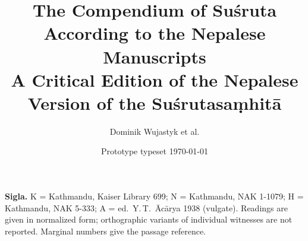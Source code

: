 \documentclass[10pt,twoside]{book}
\title{\normalfont The Compendium of Suśruta\\[4pt]
  \large According to the Nepalese Manuscripts\\[10pt]
  \normalsize A Critical Edition of the Nepalese Version of the Suśrutasaṃhitā\\[20pt]
  \Large\skt{सुश्रुतसंहिता}}
\author{\normalfont Dominik Wujastyk et al.}
\date{\normalfont Prototype typeset \today}
\providecommand{\bodyfile}{all-bodies.tex}
\begin{document}
\maketitle
{\rmfamily\small\noindent\textbf{Sigla.} K = Kathmandu, Kaiser Library 699;
N = Kathmandu, NAK 1-1079; H = Kathmandu, NAK 5-333;
A = ed.\ Y.\,T.~Ācārya 1938 (vulgate).
Readings are given in normalized form; orthographic variants of individual
witnesses are not reported.  Marginal numbers give the passage reference.\par}
\bigskip

\tableofcontents

\end{document}
